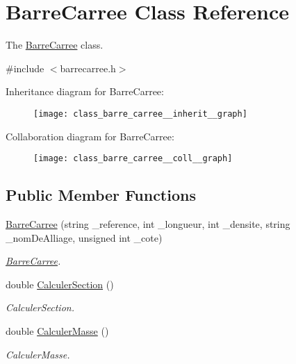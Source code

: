 \hypertarget{class_barre_carree}{}\section{Barre\+Carree Class Reference}
\label{class_barre_carree}


The \hyperlink{class_barre_carree}{Barre\+Carree} class.  




{\ttfamily \#include $<$barrecarree.\+h$>$}



Inheritance diagram for Barre\+Carree\+:
\nopagebreak
\begin{figure}[H]
\begin{center}
\leavevmode
\texttt{[image: class\_barre\_carree\_\_inherit\_\_graph]}
\end{center}
\end{figure}


Collaboration diagram for Barre\+Carree\+:
\nopagebreak
\begin{figure}[H]
\begin{center}
\leavevmode
\texttt{[image: class\_barre\_carree\_\_coll\_\_graph]}
\end{center}
\end{figure}
\subsection*{Public Member Functions}
\begin{DoxyCompactItemize}
\item 
\hyperlink{class_barre_carree_ae4f158eb244b2eb6a4ba7773dfcce872}{Barre\+Carree} (string \+\_\+reference, int \+\_\+longueur, int \+\_\+densite, string \+\_\+nom\+De\+Alliage, unsigned int \+\_\+cote)
\begin{DoxyCompactList}\small\item\em \hyperlink{class_barre_carree}{Barre\+Carree}. \end{DoxyCompactList}\item 
double \hyperlink{class_barre_carree_af525caec8240a9e7005f6da35e9ecceb}{Calculer\+Section} ()
\begin{DoxyCompactList}\small\item\em Calculer\+Section. \end{DoxyCompactList}\item 
double \hyperlink{class_barre_carree_aa999e10421ada49e8a9d0ec8451a4b58}{Calculer\+Masse} ()
\begin{DoxyCompactList}\small\item\em Calculer\+Masse. \end{DoxyCompactList}\end{DoxyCompactItemize}
